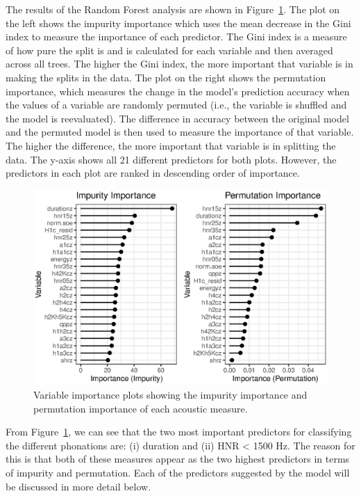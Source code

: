 The results of the Random Forest analysis are shown in Figure~\ref{fig:predictor_importance}. The plot on the left shows the impurity importance which uses the mean decrease in the Gini index to measure the importance of each predictor. The Gini index is a measure of how pure the split is and is calculated for each variable and then averaged across all trees. The higher the Gini index, the more important that variable is in making the splits in the data. The plot on the right shows the permutation importance, which measures the change in the model's prediction accuracy when the values of a variable are randomly permuted (i.e., the variable is shuffled and the model is reevaluated). The difference in accuracy between the original model and the permuted model is then used to measure the importance of that variable. The higher the difference, the more important that variable is in splitting the data. The y-axis shows all 21 different predictors for both plots. However, the predictors in each plot are ranked in descending order of importance. 

\begin{figure}[h!]
    \centering
    \includegraphics[width = \linewidth]{images/RandomForest/rf_dur_plots.eps}
    \caption{Variable importance plots showing the impurity importance and permutation importance of each acoustic measure.}
    \label{fig:predictor_importance}
\end{figure}

From Figure~\ref{fig:predictor_importance}, we can see that the two most important predictors for classifying the different phonations are: (i) duration and (ii) HNR < 1500 Hz. The reason for this is that both of these measures appear as the two highest predictors in terms of impurity and permutation. Each of the predictors suggested by the model will be discussed in more detail below. 

